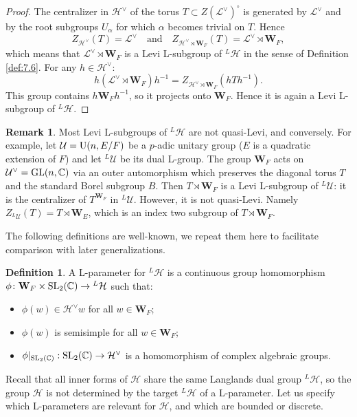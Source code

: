 \documentclass[11pt]{amsart}
\theoremstyle{definition}
\newtheorem{defn}[thm]{Definition}
\newtheorem{rem}[thm]{Remark}
\newcommand{\mb}{\mathbf}
\newcommand{\bW}{{\mathbf W}}
\newcommand{\mc}{\mathcal}
\newcommand{\C}{\mathbb C}
\def\GL{{\rm GL}}
\def\SL{{\rm SL}}
\def\cL{{\mathcal L}}
\def\cH{{\mathcal H}}
\def\rU{{\rm U}}
\begin{document}
\begin{proof}
The centralizer in $\cH^\vee$ of the torus $T \subset Z(\cL^\vee)^\circ$ is generated 
by $\cL^\vee$ and by the root subgroups $U_\alpha$ for which $\alpha$ becomes trivial
on $T$. Hence 
\[
Z_{\cH^\vee}(T) = \cL^\vee \quad \text{and} \quad 
Z_{\cH^\vee \rtimes \mb W_F}(T) = \cL^\vee \rtimes \mb W_F ,
\]
which means that $\cL^\vee \rtimes \mb W_F$ is a Levi L-subgroup of ${}^L \cH$ in
the sense of Definition \ref{def:7.6}. For any $h \in \cH^\vee$:
\[
h (\cL^\vee \rtimes \mb W_F) h^{-1} = Z_{\cH^\vee \rtimes \mb W_F}(h T h^{-1}) .
\]
This group contains $h \mb W_F h^{-1}$, so it projects onto $\mb W_F$. Hence it
is again a Levi L-subgroup of ${}^L \cH$.
\end{proof}

\begin{rem} 
Most Levi L-subgroups of ${}^L \cH$ are not quasi-Levi, and conversely. For example, let 
$\mc U = \rU(n,E/F)$ be a $p$-adic unitary group ($E$ is a quadratic extension of $F$) and 
let ${}^L \mc U$ be its dual L-group. The group $\bW_F$ acts on $\mc {U}^\vee= \GL(n,\C)$ 
via an outer automorphism which preserves the diagonal torus $T$ and the standard Borel 
subgroup $B$. Then $T \rtimes \bW_F$ is a Levi L-subgroup of ${}^L \mc U$: it is the 
centralizer of $T^{\bW_F}$ in ${}^L \mc U$.
However, it is not quasi-Levi. Namely $Z_{{}^L \mc U}(T) = T \rtimes \bW_E$, which is an 
index two subgroup of $T \rtimes \bW_F$.
\end{rem}

The following definitions are well-known, we repeat them here to facilitate
comparison with later generalizations.

\begin{defn}\label{def:7.7}
A L-parameter for ${}^L \cH$ is a continuous group homomorphism \\
$\phi \colon \mb W_F \times \SL_2 (\C) \to {}^L \cH$ such that: 
\begin{itemize}
\item $\phi (w) \in \cH^\vee w$ for all $w \in \mb W_F$;
\item $\phi (w)$ is semisimple for all $w \in \mb W_F$;
\item $\phi |_{\SL_2 (\C)} : \SL_2 (\C) \to \cH^\vee$ is a homomorphism of
complex algebraic groups.
\end{itemize}
\end{defn}
Recall that all inner forms of $\cH$ share the same Langlands dual group
${}^L \cH$, so the group $\cH$ is not determined by the target ${}^L \cH$
of a L-parameter. Let us specify which L-parameters are relevant for $\cH$, 
and which are bounded or discrete.
\end{document}
